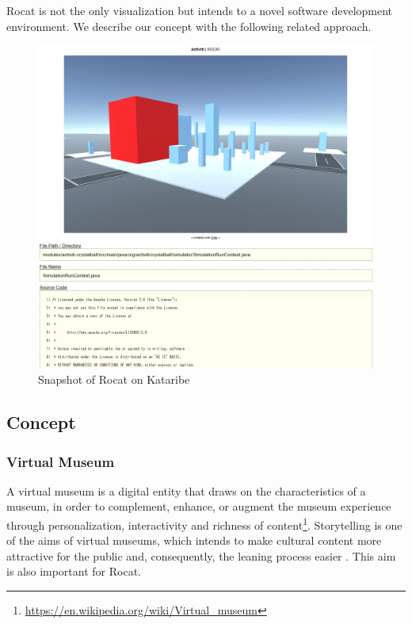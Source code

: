 \documentclass[conference]{IEEEtran}
\begin{document}
Rocat is not the only visualization but intends to a novel software development environment.
We describe our concept with the following related approach.

\begin{figure}[tb]
\centering
\includegraphics[width=\linewidth]{Rocat-on-kataribe2.pdf}
\caption{Snapshot of Rocat on Kataribe}
\label{figure:Rocat-on-kataribe}
\end{figure}


\subsection{Concept}
\subsubsection{Virtual Museum}
A virtual museum is a digital entity that draws on the characteristics of a museum, in order to complement, enhance, or augment the museum
experience through personalization, interactivity and richness of content\footnote{\url{https://en.wikipedia.org/wiki/Virtual_museum}}.
Storytelling is one of the aims of virtual museums, which intends to make cultural content more attractive for the public and, consequently, the leaning process easier \cite{Pietroni:2014:IVR:2635823.2611375}.
This aim is also important for Rocat.
\end{document}
